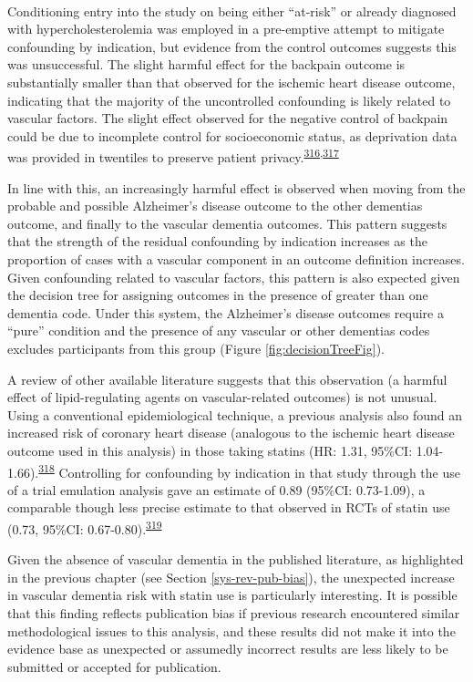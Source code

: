 \documentclass[a4paper, twoside]{templates/ociamthesis}
\begin{document}
~

Conditioning entry into the study on being either ``at-risk'' or already diagnosed with hypercholesterolemia was employed in a pre-emptive attempt to mitigate confounding by indication, but evidence from the control outcomes suggests this was unsuccessful. The slight harmful effect for the backpain outcome is substantially smaller than that observed for the ischemic heart disease outcome, indicating that the majority of the uncontrolled confounding is likely related to vascular factors. The slight effect observed for the negative control of backpain could be due to incomplete control for socioeconomic status, as deprivation data was provided in twentiles to preserve patient privacy.\textsuperscript{\protect\hyperlink{ref-boruzs2016}{316},\protect\hyperlink{ref-ikeda2019}{317}}

In line with this, an increasingly harmful effect is observed when moving from the probable and possible Alzheimer's disease outcome to the other dementias outcome, and finally to the vascular dementia outcomes. This pattern suggests that the strength of the residual confounding by indication increases as the proportion of cases with a vascular component in an outcome definition increases. Given confounding related to vascular factors, this pattern is also expected given the decision tree for assigning outcomes in the presence of greater than one dementia code. Under this system, the Alzheimer's disease outcomes require a ``pure'' condition and the presence of any vascular or other dementias codes excludes participants from this group (Figure \ref{fig:decisionTreeFig}).

A review of other available literature suggests that this observation (a harmful effect of lipid-regulating agents on vascular-related outcomes) is not unusual. Using a conventional epidemiological technique, a previous analysis also found an increased risk of coronary heart disease (analogous to the ischemic heart disease outcome used in this analysis) in those taking statins (HR: 1.31, 95\%CI: 1.04-1.66).\textsuperscript{\protect\hyperlink{ref-danaei2013}{318}} Controlling for confounding by indication in that study through the use of a trial emulation analysis gave an estimate of 0.89 (95\%CI: 0.73-1.09), a comparable though less precise estimate to that observed in RCTs of statin use (0.73, 95\%CI: 0.67-0.80).\textsuperscript{\protect\hyperlink{ref-taylor2013}{319}}

Given the absence of vascular dementia in the published literature, as highlighted in the previous chapter (see Section \ref{sys-rev-pub-bias}), the unexpected increase in vascular dementia risk with statin use is particularly interesting. It is possible that this finding reflects publication bias if previous research encountered similar methodological issues to this analysis, and these results did not make it into the evidence base as unexpected or assumedly incorrect results are less likely to be submitted or accepted for publication.
\end{document}
